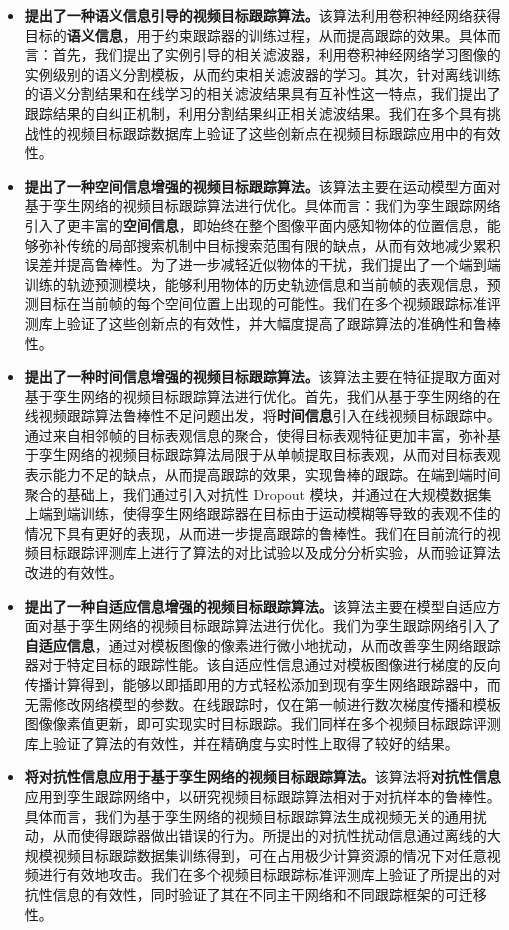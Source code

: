 \begin{itemize}
\item{\textbf{提出了一种语义信息引导的视频目标跟踪算法。}该算法利用卷积神经网络获得目标的\textbf{语义信息}，用于约束跟踪器的训练过程，从而提高跟踪的效果。具体而言：首先，我们提出了实例引导的相关滤波器，利用卷积神经网络学习图像的实例级别的语义分割模板，从而约束相关滤波器的学习。其次，针对离线训练的语义分割结果和在线学习的相关滤波结果具有互补性这一特点，我们提出了跟踪结果的自纠正机制，利用分割结果纠正相关滤波结果。我们在多个具有挑战性的视频目标跟踪数据库上验证了这些创新点在视频目标跟踪应用中的有效性。}
\item{\textbf{提出了一种空间信息增强的视频目标跟踪算法。}该算法主要在运动模型方面对基于孪生网络的视频目标跟踪算法进行优化。具体而言：我们为孪生跟踪网络引入了更丰富的\textbf{空间信息}，即始终在整个图像平面内感知物体的位置信息，能够弥补传统的局部搜索机制中目标搜索范围有限的缺点，从而有效地减少累积误差并提高鲁棒性。为了进一步减轻近似物体的干扰，我们提出了一个端到端训练的轨迹预测模块，能够利用物体的历史轨迹信息和当前帧的表观信息，预测目标在当前帧的每个空间位置上出现的可能性。我们在多个视频跟踪标准评测库上验证了这些创新点的有效性，并大幅度提高了跟踪算法的准确性和鲁棒性。}
\item{\textbf{提出了一种时间信息增强的视频目标跟踪算法。}该算法主要在特征提取方面对基于孪生网络的视频目标跟踪算法进行优化。首先，我们从基于孪生网络的在线视频跟踪算法鲁棒性不足问题出发，将\textbf{时间信息}引入在线视频目标跟踪中。通过来自相邻帧的目标表观信息的聚合，使得目标表观特征更加丰富，弥补基于孪生网络的视频目标跟踪算法局限于从单帧提取目标表观，从而对目标表观表示能力不足的缺点，从而提高跟踪的效果，实现鲁棒的跟踪。在端到端时间聚合的基础上，我们通过引入对抗性 Dropout 模块，并通过在大规模数据集上端到端训练，使得孪生网络跟踪器在目标由于运动模糊等导致的表观不佳的情况下具有更好的表现，从而进一步提高跟踪的鲁棒性。我们在目前流行的视频目标跟踪评测库上进行了算法的对比试验以及成分分析实验，从而验证算法改进的有效性。}
\item{\textbf{提出了一种自适应信息增强的视频目标跟踪算法。}该算法主要在模型自适应方面对基于孪生网络的视频目标跟踪算法进行优化。我们为孪生跟踪网络引入了\textbf{自适应信息}，通过对模板图像的像素进行微小地扰动，从而改善孪生网络跟踪器对于特定目标的跟踪性能。该自适应性信息通过对模板图像进行梯度的反向传播计算得到，能够以即插即用的方式轻松添加到现有孪生网络跟踪器中，而无需修改网络模型的参数。在线跟踪时，仅在第一帧进行数次梯度传播和模板图像像素值更新，即可实现实时目标跟踪。我们同样在多个视频目标跟踪评测库上验证了算法的有效性，并在精确度与实时性上取得了较好的结果。}
\item{\textbf{将对抗性信息应用于基于孪生网络的视频目标跟踪算法。}该算法将\textbf{对抗性信息}应用到孪生跟踪网络中，以研究视频目标跟踪算法相对于对抗样本的鲁棒性。具体而言，我们为基于孪生网络的视频目标跟踪算法生成视频无关的通用扰动，从而使得跟踪器做出错误的行为。所提出的对抗性扰动信息通过离线的大规模视频目标跟踪数据集训练得到，可在占用极少计算资源的情况下对任意视频进行有效地攻击。我们在多个视频目标跟踪标准评测库上验证了所提出的对抗性信息的有效性，同时验证了其在不同主干网络和不同跟踪框架的可迁移性。}
\end{itemize}

